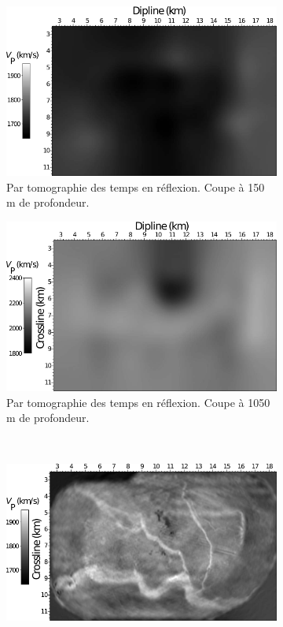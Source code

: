 \begin{figure}[!h]
    \centering
    \begin{subfigure}[b]{0.4\textwidth}
        \includegraphics[width=\textwidth]{img/geophy1.png}
        \caption{ Par tomographie des temps en réflexion. Coupe à 150 m de profondeur.}
        \label{}
    \end{subfigure}
    \hspace{0.5cm}
    \begin{subfigure}[b]{0.4\textwidth}
        \includegraphics[width=\textwidth]{img/geophy2.png}
        \caption{Par tomographie des temps en réflexion. Coupe à 1050 m de profondeur.}
        \label{}
    \end{subfigure}\\[0.5cm]
    \begin{subfigure}[b]{0.4\textwidth}
        \includegraphics[width=\textwidth]{img/geophy3.png}

\end{subfigure}
\end{figure}
